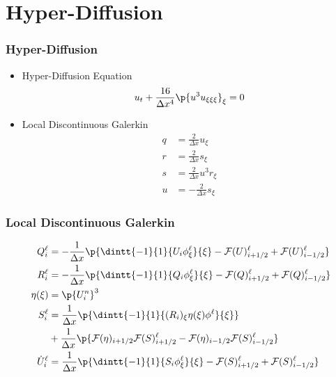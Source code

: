 \documentclass[10pt]{beamer}
\begin{document}
  \section{Hyper-Diffusion}
    \begin{frame}
      \frametitle{Hyper-Diffusion}
      \begin{itemize}
        \item Hyper-Diffusion Equation
          \[
            u_t + \frac{16}{\Delta x^4} \p{u^3 u_{\xi\xi\xi}}_\xi = 0
          \]

        \item Local Discontinuous Galerkin
          \begin{align*}
            q &= \frac{2}{\Delta x} u_{\xi} \\
            r &= \frac{2}{\Delta x} s_{\xi} \\
            s &= \frac{2}{\Delta x} u^3 r_{\xi} \\
            u &= -\frac{2}{\Delta x} s_{\xi}
          \end{align*}

      \end{itemize}
    \end{frame}

    \begin{frame}
      \frametitle{Local Discontinuous Galerkin}
      \begin{align*}
        Q_i^{\ell} &= -\frac{1}{\Delta x} \p{\dintt{-1}{1}{U_i \phi_{\xi}^{\ell}}{\xi}
        - \mcF(U)_{i+1/2}^{\ell} + \mcF(U)_{i - 1/2}^{\ell}} \\
        R_i^{\ell} &= -\frac{1}{\Delta x} \p{\dintt{-1}{1}{Q_i \phi_{\xi}^{\ell}}{\xi}
        - \mcF(Q)_{i+1/2}^{\ell} + \mcF(Q)_{i - 1/2}^{\ell}} \\
        \eta(\xi) &= \p{U_i^{n}}^3 \\
        S_i^{\ell} &= \frac{1}{\Delta x} \p{\dintt{-1}{1}{(R_i)_{\xi} \eta(\xi) \phi^{\ell}}{\xi}} \\
        &+ \frac{1}{\Delta x}\p{\mcF(\eta)_{i + 1/2} \mcF(S)_{i+1/2}^{\ell} - \mcF(\eta)_{i-1/2} \mcF(S)_{i-1/2}^{\ell}}\\
        \dot{U}_i^{\ell} &= \frac{1}{\Delta x} \p{\dintt{-1}{1}{S_i \phi_{\xi}^{\ell}}{\xi}
        - \mcF(S)_{i+1/2}^{\ell} + \mcF(S)_{i - 1/2}^{\ell}}
      \end{align*}
    \end{frame}
\end{document}
